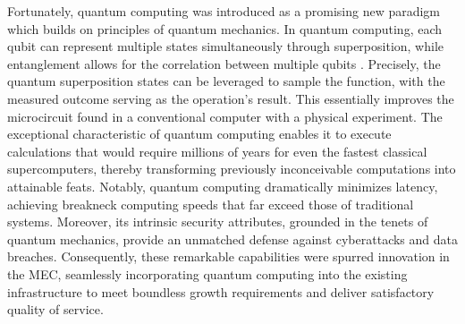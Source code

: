 \documentclass[journal]{IEEEtran}
\begin{document}
Fortunately, quantum computing was introduced as a promising new paradigm which builds on principles of quantum mechanics. In quantum computing, each qubit can represent multiple states simultaneously through superposition, while entanglement allows for the correlation between multiple qubits
\cite{pittenger2012introduction,rietsche2022quantum}.
Precisely, the quantum superposition states can be leveraged to sample the function, with the measured outcome serving as the operation's result.
This essentially improves the microcircuit found in a conventional computer with a physical experiment.
The exceptional characteristic of quantum computing enables it to execute calculations that would require millions of years for even the fastest classical supercomputers, thereby transforming previously inconceivable computations into attainable feats\cite{rietsche2022quantum}.
Notably, quantum computing dramatically minimizes latency, achieving breakneck computing speeds that far exceed those of traditional systems. Moreover, its intrinsic security attributes, grounded in the tenets of quantum mechanics, provide an unmatched defense against cyberattacks and data breaches.
Consequently, these remarkable capabilities were spurred innovation in the MEC, seamlessly incorporating quantum computing into the existing infrastructure to meet boundless growth requirements and deliver satisfactory quality of service.
\end{document}
